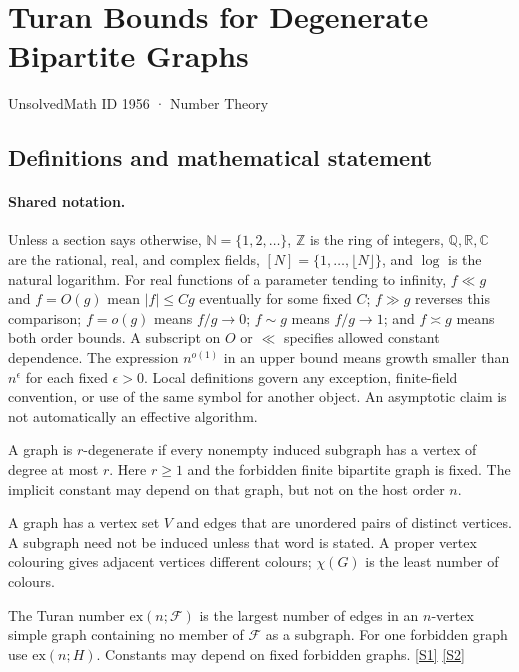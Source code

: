 \documentclass[11pt,a4paper]{article}
\newcommand{\N}{\mathbb{N}}
\newcommand{\Z}{\mathbb{Z}}
\newcommand{\Q}{\mathbb{Q}}
\newcommand{\R}{\mathbb{R}}
\newcommand{\C}{\mathbb{C}}
\newcommand{\sref}[2]{\hyperlink{source:#1:#2}{[S#2]}}
\begin{document}

\setcounter{section}{1955}

\section{Turan Bounds for Degenerate Bipartite Graphs}\label{1956}

{\small\sffamily UnsolvedMath ID 1956 · Number Theory}

\subsection{Definitions and mathematical statement}

\paragraph{Shared notation.}Unless a section says otherwise, $\N=\{1,2,\ldots\}$,
$\Z$ is the ring of integers, $\Q,\R,\C$ are the rational, real, and complex
fields, $[N]=\{1,\ldots,\lfloor N\rfloor\}$, and $\log$ is the natural
logarithm. For real functions of a parameter tending to infinity,
$f\ll g$ and $f=O(g)$ mean $|f|\leq Cg$ eventually for some fixed $C$;
$f\gg g$ reverses this comparison; $f=o(g)$ means $f/g\to0$;
$f\sim g$ means $f/g\to1$; and $f\asymp g$ means both order bounds.
A subscript on $O$ or $\ll$ specifies allowed constant dependence.
The expression $n^{o(1)}$ in an upper bound means growth smaller than
$n^\epsilon$ for each fixed $\epsilon>0$. Local definitions govern any
exception, finite-field convention, or use of the same symbol for another
object. An asymptotic claim is not automatically an effective algorithm.



A graph is $r$-degenerate if every nonempty induced subgraph has a vertex of degree at most $r$. Here $r\geq1$ and the forbidden finite bipartite graph is fixed. The implicit constant may depend on that graph, but not on the host order $n$.

A graph has a vertex set $V$ and edges that are unordered pairs of distinct vertices. A subgraph need not be induced unless that word is stated. A proper vertex colouring gives adjacent vertices different colours; $\chi(G)$ is the least number of colours.

The Turan number $\mathrm{ex}(n;\mathcal F)$ is the largest number of edges in an $n$-vertex simple graph containing no member of $\mathcal F$ as a subgraph. For one forbidden graph use $\mathrm{ex}(n;H)$. Constants may depend on fixed forbidden graphs. \sref{1956}{1} \sref{1956}{2}
\end{document}
